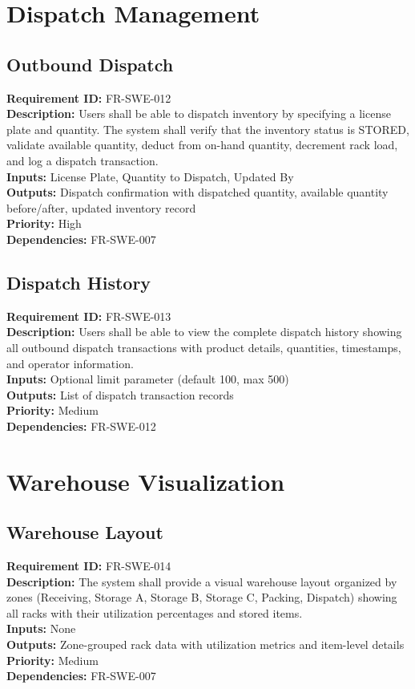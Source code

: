 \documentclass[12pt,a4paper]{report}
\begin{document}
\section{Dispatch Management}

\subsection{Outbound Dispatch}
\noindent\textbf{Requirement ID:} FR-SWE-012\\
\textbf{Description:} Users shall be able to dispatch inventory by specifying a license plate and quantity. The system shall verify that the inventory status is STORED, validate available quantity, deduct from on-hand quantity, decrement rack load, and log a dispatch transaction.\\
\textbf{Inputs:} License Plate, Quantity to Dispatch, Updated By\\
\textbf{Outputs:} Dispatch confirmation with dispatched quantity, available quantity before/after, updated inventory record\\
\textbf{Priority:} High\\
\textbf{Dependencies:} FR-SWE-007

\subsection{Dispatch History}
\noindent\textbf{Requirement ID:} FR-SWE-013\\
\textbf{Description:} Users shall be able to view the complete dispatch history showing all outbound dispatch transactions with product details, quantities, timestamps, and operator information.\\
\textbf{Inputs:} Optional limit parameter (default 100, max 500)\\
\textbf{Outputs:} List of dispatch transaction records\\
\textbf{Priority:} Medium\\
\textbf{Dependencies:} FR-SWE-012

\section{Warehouse Visualization}

\subsection{Warehouse Layout}
\noindent\textbf{Requirement ID:} FR-SWE-014\\
\textbf{Description:} The system shall provide a visual warehouse layout organized by zones (Receiving, Storage A, Storage B, Storage C, Packing, Dispatch) showing all racks with their utilization percentages and stored items.\\
\textbf{Inputs:} None\\
\textbf{Outputs:} Zone-grouped rack data with utilization metrics and item-level details\\
\textbf{Priority:} Medium\\
\textbf{Dependencies:} FR-SWE-007
\end{document}
